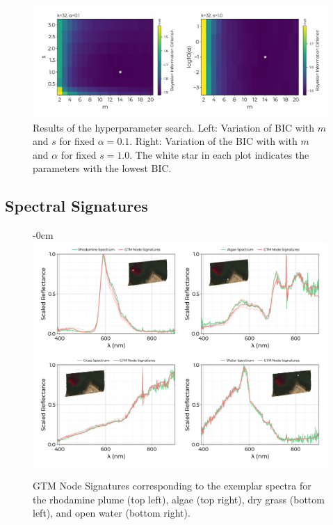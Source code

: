 \documentclass[remotesensing,article,submit,pdftex,moreauthors]{Definitions/mdpi}
\begin{document}
\begin{figure}[t]
\centering
\includegraphics[width=\textwidth]{paper/figures/results/bic.pdf}
\caption{Results of the hyperparameter search. Left: Variation of BIC with $m$ and $s$ for fixed $\alpha=0.1$. Right: Variation of the BIC with with $m$ and $\alpha$ for fixed $s=1.0$. The white star in each plot indicates the parameters with the lowest BIC.\label{fig:hp-results}}
\end{figure}  


\subsection{Spectral Signatures}


\begin{figure}[t]
\begin{adjustwidth}{-\extralength}{0cm}
\centering
\includegraphics[width=15.5cm]{paper/figures/results/spectral-signatures.png}
\end{adjustwidth}
\caption{GTM Node Signatures corresponding to the exemplar spectra for the rhodamine plume (top left), algae (top right), dry grass (bottom left), and open water (bottom right). \label{fig:spectral-signautes}}
\end{figure}  
\end{document}
